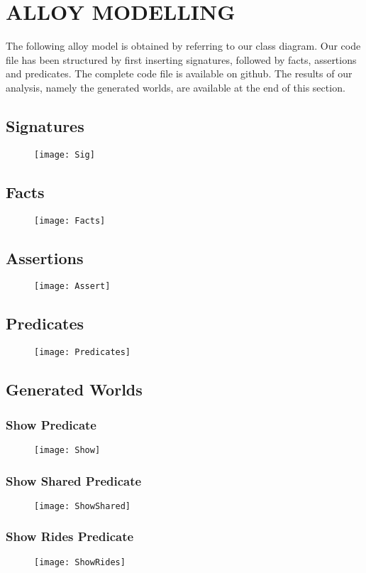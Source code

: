 \section{ALLOY MODELLING} 
The following alloy model is obtained by referring to our class diagram. Our code file has been structured by first inserting signatures, followed by facts, assertions and predicates.
The complete code file is available on github. The results of our analysis, namely the generated worlds, are available at the end of this section.

\subsection{Signatures}
\begin{figure}[h!]
	\centering
	\texttt{[image: Sig]}
\end{figure}

\newpage

\subsection{Facts}
\begin{figure}[h!]
	\centering
	\texttt{[image: Facts]}
\end{figure}

\newpage
\subsection{Assertions}
\begin{figure}[h!]
	\centering
	\texttt{[image: Assert]}
\end{figure}

\newpage
\subsection{Predicates}
\begin{figure}[h!]
	\centering
	\texttt{[image: Predicates]}
\end{figure}

\newpage

\subsection{Generated Worlds}
\subsubsection{Show Predicate}
\begin{figure}[h!]
	\texttt{[image: Show]}
\end{figure}
\newpage

\subsubsection{Show Shared Predicate}

\begin{figure}[h!]
	\texttt{[image: ShowShared]}
\end{figure}
\newpage

\subsubsection{Show Rides Predicate}
\begin{figure}[h!]
	\texttt{[image: ShowRides]}
\end{figure}
\newpage
